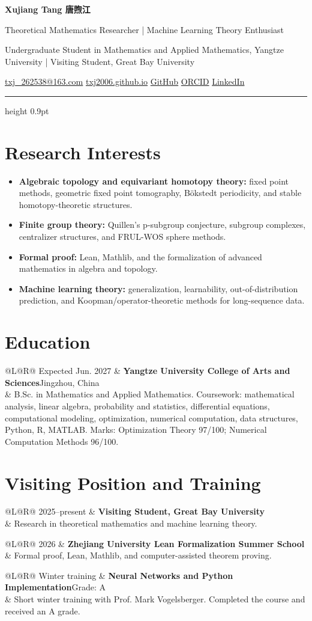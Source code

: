 \documentclass[9pt,letterpaper]{extarticle}
\makeatletter
\newcommand{\name}[1]{\begin{center}{\fontsize{23}{26}\selectfont\bfseries\color{accent}#1}\end{center}}
\newcommand{\tagline}[1]{\begin{center}{\sffamily\small\color{textgray}#1}\end{center}\vspace{-0.25em}}
\newcommand{\contact}[1]{\begin{center}{\small\color{muted}#1}\end{center}}
\newcommand{\entry}[4]{%
  \begin{tabularx}{\linewidth}{@{}L@{\hspace{0.035\linewidth}}R@{}}
  #1 & {\bfseries #2}\hfill {\sffamily\footnotesize\color{muted}#3}\\[-0.15em]
     & #4
  \end{tabularx}\vspace{0.18em}
}
\makeatother
\begin{document}
\name{Xujiang Tang {\chinesefont 唐煦江}}
\tagline{Theoretical Mathematics Researcher \; | \; Machine Learning Theory Enthusiast}
\tagline{Undergraduate Student in Mathematics and Applied Mathematics, Yangtze University \; | \; Visiting Student, Great Bay University}
\contact{\href{mailto:txj_262538@163.com}{txj\_262538@163.com} \;\textbar\; \href{https://txj2006.github.io}{txj2006.github.io} \;\textbar\; \href{https://github.com/TXJ2006}{GitHub} \;\textbar\; \href{https://orcid.org/0009-0008-1127-6420}{ORCID} \;\textbar\; \href{https://www.linkedin.com/in/\%E7\%85\%A6\%E6\%B1\%9F-\%E5\%94\%90-7a1513392}{LinkedIn}}
\vspace{0.45em}
\color{rulegray}\hrule height 0.9pt\color{textgray}
\vspace{0.55em}

\section{Research Interests}
\begin{itemize}
  \item \textbf{Algebraic topology and equivariant homotopy theory:} fixed point methods, geometric fixed point tomography, Bökstedt periodicity, and stable homotopy-theoretic structures.
  \item \textbf{Finite group theory:} Quillen's p-subgroup conjecture, subgroup complexes, centralizer structures, and FRUL-WOS sphere methods.
  \item \textbf{Formal proof:} Lean, Mathlib, and the formalization of advanced mathematics in algebra and topology.
  \item \textbf{Machine learning theory:} generalization, learnability, out-of-distribution prediction, and Koopman/operator-theoretic methods for long-sequence data.
\end{itemize}

\section{Education}
\entry{Expected Jun. 2027}{Yangtze University College of Arts and Sciences}{Jingzhou, China}{B.Sc. in Mathematics and Applied Mathematics. Coursework: mathematical analysis, linear algebra, probability and statistics, differential equations, computational modeling, optimization, numerical computation, data structures, Python, R, MATLAB. Marks: Optimization Theory 97/100; Numerical Computation Methods 96/100.}

\section{Visiting Position and Training}
\entry{2025--present}{Visiting Student, Great Bay University}{}{Research in theoretical mathematics and machine learning theory.}
\entry{2026}{Zhejiang University Lean Formalization Summer School}{}{Formal proof, Lean, Mathlib, and computer-assisted theorem proving.}
\entry{Winter training}{Neural Networks and Python Implementation}{Grade: A}{Short winter training with Prof. Mark Vogelsberger. Completed the course and received an A grade.}
\end{document}
